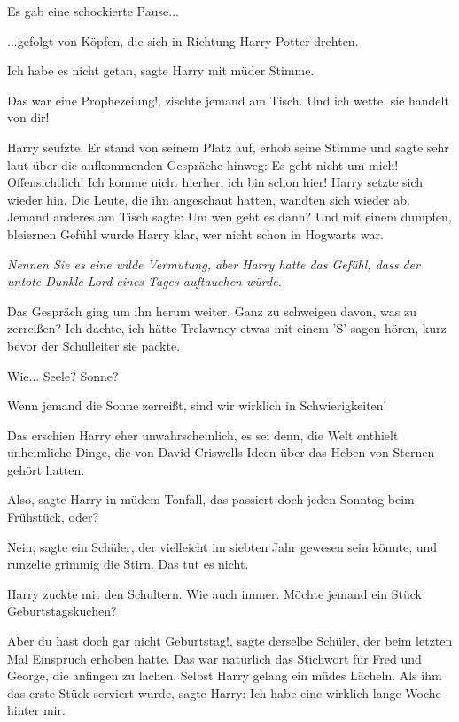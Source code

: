 Es gab eine schockierte Pause...

...gefolgt von Köpfen, die sich in Richtung Harry Potter drehten.

\glqq{}Ich habe es nicht getan\grqq{}, sagte Harry mit müder Stimme.

\glqq{}Das war eine Prophezeiung!\grqq{}, zischte jemand am Tisch. \glqq{}Und ich
wette, sie handelt von dir!\grqq{}

Harry seufzte. Er stand von seinem Platz auf, erhob seine Stimme und sagte sehr
laut über die aufkommenden Gespräche hinweg: \glqq{}Es geht nicht um mich!
Offensichtlich! Ich komme nicht hierher, ich bin schon hier!\grqq{} Harry setzte
sich wieder hin. Die Leute, die ihn angeschaut hatten, wandten sich wieder ab.
Jemand anderes am Tisch sagte: \glqq{}Um wen geht es dann?\grqq{} Und mit einem
dumpfen, bleiernen Gefühl wurde Harry klar, wer nicht schon in Hogwarts war.

\emph{Nennen Sie es eine wilde Vermutung, aber Harry hatte das Gefühl, dass der
untote Dunkle Lord eines Tages auftauchen würde.}

Das Gespräch ging um ihn herum weiter. \glqq{}Ganz zu schweigen davon, was zu
zerreißen?\grqq{} \glqq{}Ich dachte, ich hätte Trelawney etwas mit einem 'S'
sagen hören, kurz bevor der Schulleiter sie packte.\grqq{}

\glqq{}Wie... Seele? Sonne?\grqq{}

\glqq{}Wenn jemand die Sonne zerreißt, sind wir wirklich in
Schwierigkeiten!\grqq{}

Das erschien Harry eher unwahrscheinlich, es sei denn, die Welt enthielt
unheimliche Dinge, die von David Criswells Ideen über das Heben von Sternen
gehört hatten.

\glqq{}Also\grqq{}, sagte Harry in müdem Tonfall, \glqq{}das passiert doch jeden
Sonntag beim Frühstück, oder?\grqq{}

\glqq{}Nein\grqq{}, sagte ein Schüler, der vielleicht im siebten Jahr gewesen
sein könnte, und runzelte grimmig die Stirn. \glqq{}Das tut es nicht.\grqq{}

Harry zuckte mit den Schultern. \glqq{}Wie auch immer. Möchte jemand ein Stück
Geburtstagskuchen?\grqq{}

\glqq{}Aber du hast doch gar nicht Geburtstag!\grqq{}, sagte derselbe Schüler,
der beim letzten Mal Einspruch erhoben hatte. Das war natürlich das Stichwort
für Fred und George, die anfingen zu lachen. Selbst Harry gelang ein müdes
Lächeln. Als ihm das erste Stück serviert wurde, sagte Harry: \glqq{}Ich habe
eine wirklich lange Woche hinter mir.\grqq{}

